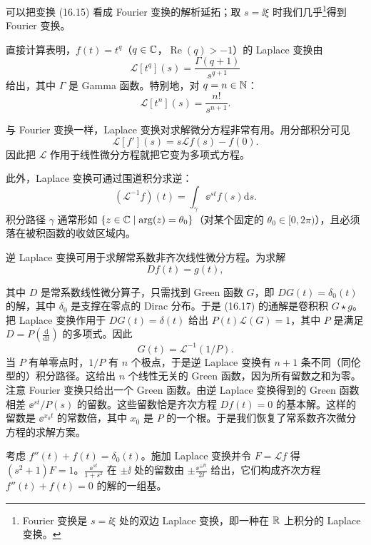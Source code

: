 可以把变换 (16.15) 看成 Fourier 变换的解析延拓；取 $s=\ii\xi$ 时我们几乎\footnote{Fourier 变换是 $s=\ii\xi$ 处的双边 Laplace 变换，即一种在 $\mathbb{R}$ 上积分的 Laplace 变换。}得到 Fourier 变换。

\begin{example}[16.6] 直接计算表明，$f(t)=t^q$（$q\in\mathbb{C}$，$\operatorname{Re}(q)>-1$）的 Laplace 变换由
\[
\mathcal{L}[t^q](s)=\frac{\Gamma(q+1)}{s^{q+1}}
\]
给出，其中 $\Gamma$ 是 Gamma 函数。特别地，对 $q=n\in\mathbb{N}$：
\begin{equation}
\mathcal{L}[t^n](s)=\frac{n!}{s^{n+1}}.
\tag{16.16}
\end{equation}
\end{example}

与 Fourier 变换一样，Laplace 变换对求解微分方程非常有用。用分部积分可见
\[
\mathcal{L}[f'](s)=s\mathcal{L}f(s)-f(0).
\]
因此把 $\mathcal{L}$ 作用于线性微分方程就把它变为多项式方程。

此外，Laplace 变换可通过围道积分求逆：
\[
(\mathcal{L}^{-1}f)(t)=\int_\gamma \ee^{st}f(s)\mathrm{d}s.
\]
积分路径 $\gamma$ 通常形如 $\{z\in\mathbb{C}\mid\arg(z)=\theta_0\}$（对某个固定的 $\theta_0\in[0,2\pi)$），且必须落在被积函数的收敛区域内。

逆 Laplace 变换可用于求解常系数非齐次线性微分方程。为求解
\begin{equation}
Df(t)=g(t),
\tag{16.17}
\end{equation}

其中 $D$ 是常系数线性微分算子，只需找到 Green 函数 $G$，即 $DG(t)=\delta_0(t)$ 的解，其中 $\delta_0$ 是支撑在零点的 Dirac 分布。于是 (16.17) 的通解是卷积积 $G\star g$。把 Laplace 变换作用于 $DG(t)=\delta(t)$ 给出 $P(t)\mathcal{L}(G)=1$，其中 $P$ 是满足 $D=P\left(\frac{\mathrm{d}}{\mathrm{d}t}\right)$ 的多项式。因此
\[
G(t)=\mathcal{L}^{-1}(1/P).
\]
当 $P$ 有单零点时，$1/P$ 有 $n$ 个极点，于是逆 Laplace 变换有 $n+1$ 条不同（同伦型的）积分路径。这给出 $n$ 个线性无关的 Green 函数，因为所有留数之和为零。注意 Fourier 变换只给出一个 Green 函数。由逆 Laplace 变换得到的 Green 函数相差 $\ee^{st}/P(s)$ 的留数。这些留数恰是齐次方程 $Df(t)=0$ 的基本解。这样的留数是 $\ee^{x_0t}$ 的常数倍，其中 $x_0$ 是 $P$ 的一个根。于是我们恢复了常系数齐次微分方程的求解方案。

\begin{example}[16.7] 考虑 $f''(t)+f(t)=\delta_0(t)$。施加 Laplace 变换并令 $F=\mathcal{L}f$ 得 $(s^2+1)F=1$。$\frac{\ee^{st}}{1+s^2}$ 在 $\pm\ii$ 处的留数由 $\pm\frac{\ee^{\pm\ii t}}{2\ii}$ 给出，它们构成齐次方程 $f''(t)+f(t)=0$ 的解的一组基。\end{example}

